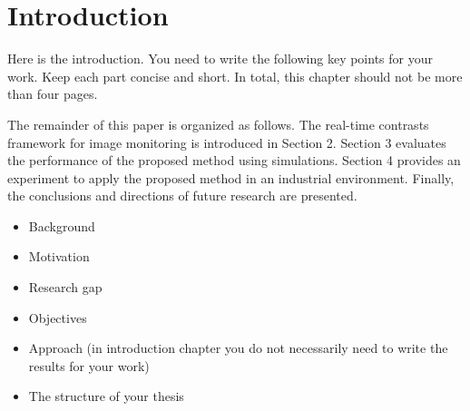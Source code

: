 \chapter{Introduction}
\label{cp:Introduction}

Here is the introduction. You need to write the following key points for your work. Keep each part concise and short. In total, this chapter should not be more than four pages.

The remainder of this paper is organized as follows. The
real-time contrasts framework for image monitoring is
introduced in Section 2. Section 3 evaluates the performance
of the proposed method using simulations. Section 4
provides an experiment to apply the proposed method in an
industrial environment. Finally, the conclusions and
directions of future research are presented.

\begin{itemize}
    \item Background
    \item Motivation
    \item Research gap
    \item Objectives
    \item Approach (in introduction chapter you do not necessarily need to write the results for your work)
    \item The structure of your thesis
\end{itemize}